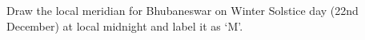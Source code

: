Draw the local meridian for Bhubaneswar on Winter Solstice day (22nd December)
at local midnight and label it as `M'.

